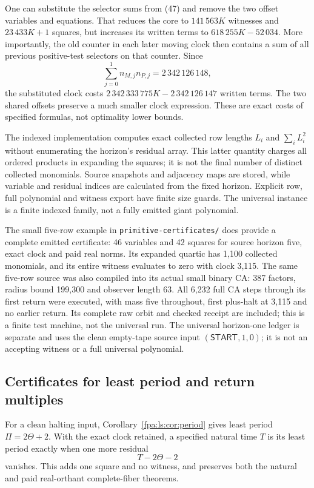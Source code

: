 \documentclass[11pt,a4paper]{article}
\numberwithin{equation}{section}
\newcommand{\START}{\mathsf{START}}
\newcommand{\code}[1]{\texttt{\small #1}}
\begin{document}
One can substitute the selector sums from (47) and remove the two offset
variables and equations. That reduces the core to $141\,563K$ witnesses and
$23\,433K+1$ squares, but increases its written terms to
$618\,255K-52\,034$. More importantly, the old counter in each later moving
clock then contains a sum of all previous positive-test selectors on that
counter. Since
\[
 \sum_{j=0}^1 n_{M,j}n_{P,j}=2\,342\,126\,148,
\]
the substituted clock costs $2\,342\,333\,775K-2\,342\,126\,147$ written
terms. The two shared offsets preserve a much smaller clock expression.
These are exact costs of specified formulas, not optimality lower bounds.

The indexed implementation computes exact collected row lengths $L_i$ and
$\sum_iL_i^2$ without enumerating the horizon's residual array. This latter
quantity charges all ordered products in expanding the squares; it is not
the final number of distinct collected monomials. Source snapshots and
adjacency maps are stored, while variable and residual indices are calculated
from the fixed horizon. Explicit row, full polynomial and witness export
have finite size guards. The universal instance is a finite indexed family,
not a fully emitted giant polynomial.

The small five-row example in \code{primitive-certificates/} does provide a
complete emitted certificate: 46 variables and 42 squares for source horizon
five, exact clock and paid real norms. Its expanded quartic has 1,100
collected monomials, and its entire witness evaluates to zero with clock
3,115. The same five-row source was also compiled into its actual small
binary CA: 387 factors, radius bound 199,300 and observer length 63. All
6,232 full CA steps through its first return were executed, with mass five
throughout, first plus-halt at 3,115 and no earlier return. Its complete raw
orbit and checked receipt are included; this is a finite test machine, not
the universal run. The universal horizon-one ledger is separate and uses the clean
empty-tape source input $(\START,1,0)$; it is not an accepting witness or a
full universal polynomial.

\subsection{Certificates for least period and return multiples}
For a clean halting input, Corollary~\ref{fpa:ls:cor:period} gives least period
$\Pi=2\Theta+2$. With the exact clock retained, a specified natural time $T$
is its least period exactly when one more residual
\[
                              T-2\Theta-2                         \tag{53}
\]
vanishes. This adds one square and no witness, and preserves both the natural
and paid real-orthant complete-fiber theorems.
\end{document}
